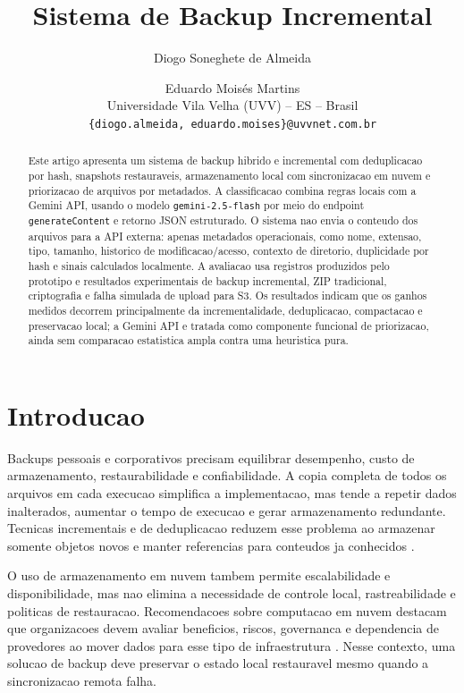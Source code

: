 \documentclass[12pt,a4paper]{article}
\title{Sistema de Backup Incremental}
\author{
Diogo Soneghete de Almeida \and Eduardo Mois\'es Martins\\
Universidade Vila Velha (UVV) -- ES -- Brasil\\
{\small\texttt{\{diogo.almeida, eduardo.moises\}@uvvnet.com.br}}
}
\date{}
\begin{document}
\maketitle

\begin{abstract}
Este artigo apresenta um sistema de backup hibrido e incremental com deduplicacao por hash, snapshots restauraveis, armazenamento local com sincronizacao em nuvem e priorizacao de arquivos por metadados. A classificacao combina regras locais com a Gemini API, usando o modelo \texttt{gemini-2.5-flash} por meio do endpoint \texttt{generateContent} e retorno JSON estruturado. O sistema nao envia o conteudo dos arquivos para a API externa: apenas metadados operacionais, como nome, extensao, tipo, tamanho, historico de modificacao/acesso, contexto de diretorio, duplicidade por hash e sinais calculados localmente. A avaliacao usa registros produzidos pelo prototipo e resultados experimentais de backup incremental, ZIP tradicional, criptografia e falha simulada de upload para S3. Os resultados indicam que os ganhos medidos decorrem principalmente da incrementalidade, deduplicacao, compactacao e preservacao local; a Gemini API e tratada como componente funcional de priorizacao, ainda sem comparacao estatistica ampla contra uma heuristica pura.
\end{abstract}

\section{Introducao}

Backups pessoais e corporativos precisam equilibrar desempenho, custo de armazenamento, restaurabilidade e confiabilidade. A copia completa de todos os arquivos em cada execucao simplifica a implementacao, mas tende a repetir dados inalterados, aumentar o tempo de execucao e gerar armazenamento redundante. Tecnicas incrementais e de deduplicacao reduzem esse problema ao armazenar somente objetos novos e manter referencias para conteudos ja conhecidos \cite{lillibridge2009sparse}.

O uso de armazenamento em nuvem tambem permite escalabilidade e disponibilidade, mas nao elimina a necessidade de controle local, rastreabilidade e politicas de restauracao. Recomendacoes sobre computacao em nuvem destacam que organizacoes devem avaliar beneficios, riscos, governanca e dependencia de provedores ao mover dados para esse tipo de infraestrutura \cite{nist800146}. Nesse contexto, uma solucao de backup deve preservar o estado local restauravel mesmo quando a sincronizacao remota falha.
\end{document}

